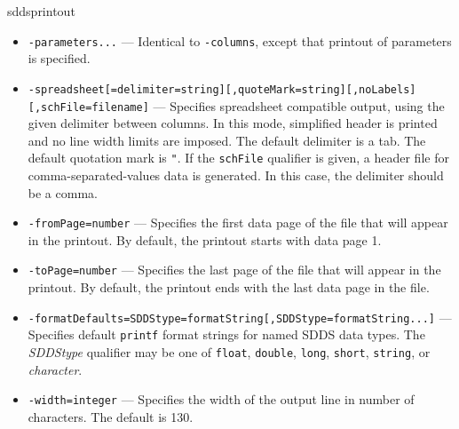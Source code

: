 \begin{sddsprog}{sddsprintout}
\begin{itemize}
        The \verb|format| qualifier may be used to specify a \verb|printf|-style format string for the named columns; in this case, all of the columns must have the same data type. The format string should contain a width field, to ensure proper alignment of text, e.g., \verb|%30s| rather than \verb|%s|. The \verb|useDefaultFormat| qualifier directs that \verb|sddsprintout| use its own default format for the data type in question, as opposed to any format that might be specified in the SDDS header.
        The \verb|label| qualifier can be used to specify the column label in the printout (by default, the column name is used); the label may be edited using the \verb|editLabel| qualifier and a standard editing sequence.
        If the \verb|endsLine| qualifier is given, a line break is issued after the last column of the list is printed. The \verb|blankLines| qualifier may be used to specify that one or more blank lines be emitted following such a line break.
        Any number of \verb|-columns| options may be given.
      \item \verb|-parameters...| --- Identical to \verb|-columns|, except that printout of parameters is specified.
      \item \verb|-spreadsheet[=delimiter=string][,quoteMark=string][,noLabels][,schFile=filename]| --- Specifies spreadsheet compatible output, using the given delimiter between columns. In this mode, simplified header is printed and no line width limits are imposed. The default delimiter is a tab. The default quotation mark is \verb|"|. If the \verb|schFile| qualifier is given, a header file for comma-separated-values data is generated. In this case, the delimiter should be a comma.
      \item \verb|-fromPage=number| --- Specifies the first data page of the file that will appear in the printout. By default, the printout starts with data page 1.
      \item \verb|-toPage=number| --- Specifies the last page of the file that will appear in the printout. By default, the printout ends with the last data page in the file.
      \item \verb|-formatDefaults=SDDStype=formatString[,SDDStype=formatString...]| --- Specifies default \verb|printf| format strings for named SDDS data types. The \emph{SDDStype} qualifier may be one of \verb|float|, \verb|double|, \verb|long|, \verb|short|, \verb|string|, or \emph{character}.
      \item \verb|-width=integer| --- Specifies the width of the output line in number of characters. The default is 130.

\end{itemize}
\end{sddsprog}
